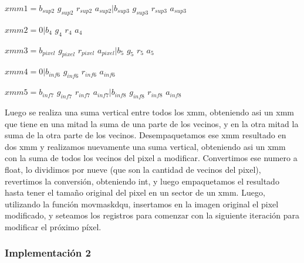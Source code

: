 \documentclass[a4paper]{article}
\begin{document}
$xmm1=  b_{sup2}$ $g_{sup2}$ $r_{sup2}$ $a_{sup2}|b_{sup3}$ $g_{sup3}$ $r_{sup3}$ $a_{sup3}$  

\vspace*{0.3cm}

$xmm2=  0         |b_{4}$ $g_{4}$ $r_{4}$ $a_{4}$

\vspace*{0.3cm}

$xmm3=  b_{pixel}$ $g_{pixel}$ $r_{pixel}$ $a_{pixel}     |b_{5}$ $g_{5}$ $r_{5}$ $a_{5}$

\vspace*{0.3cm}

$xmm4=  0         |b_{inf6}$ $g_{inf6}$ $r_{inf6}$ $a_{inf6} $ 

\vspace*{0.3cm}

$xmm5=  b_{inf7}$ $g_{inf7}$ $r_{inf7}$ $a_{inf7}|b_{inf8}$ $g_{inf8}$ $r_{inf8}$ $a_{inf8}$

\vspace*{0.3cm}

Luego se realiza una suma vertical entre todos los xmm, obteniendo asi un xmm que tiene en una mitad la suma de una parte de los vecinos, y en la otra mitad la suma de la otra parte de los vecinos. Desempaquetamos ese xmm resultado en dos xmm y realizamos nuevamente una suma vertical, obteniendo asi un xmm con la suma de todos los vecinos del pixel a modificar. Convertimos ese numero a float, lo dividimos por nueve (que son la cantidad de vecinos del pixel), revertimos la conversión, obteniendo int, y luego empaquetamos el resultado hasta tener el tamaño original del pixel en un sector de un xmm. Luego, utilizando la función movmaskdqu, insertamos en la imagen original el pixel modificado, y seteamos los registros para comenzar con la siguiente iteración para modificar el próximo píxel.  

\subsubsection{Implementación 2}
\end{document}
